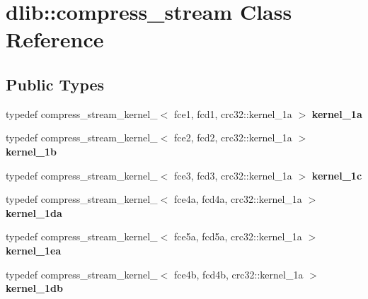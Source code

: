 \hypertarget{classdlib_1_1compress__stream}{
\section{dlib::compress\_\-stream Class Reference}
\label{classdlib_1_1compress__stream}
}
\subsection*{Public Types}
\begin{DoxyCompactItemize}
\item 
\hypertarget{classdlib_1_1compress__stream_a7ac38313ebb877bf19451de0c0380d0f}{
typedef compress\_\-stream\_\-kernel\_$<$ fce1, fcd1, crc32::kernel\_\-1a $>$ {\bfseries kernel\_\-1a}}
\label{classdlib_1_1compress__stream_a7ac38313ebb877bf19451de0c0380d0f}

\item 
\hypertarget{classdlib_1_1compress__stream_a7fb1453dd170b9e3898d428b9a96f62a}{
typedef compress\_\-stream\_\-kernel\_$<$ fce2, fcd2, crc32::kernel\_\-1a $>$ {\bfseries kernel\_\-1b}}
\label{classdlib_1_1compress__stream_a7fb1453dd170b9e3898d428b9a96f62a}

\item 
\hypertarget{classdlib_1_1compress__stream_afaa6401526a71d7a9ca30ee995839264}{
typedef compress\_\-stream\_\-kernel\_$<$ fce3, fcd3, crc32::kernel\_\-1a $>$ {\bfseries kernel\_\-1c}}
\label{classdlib_1_1compress__stream_afaa6401526a71d7a9ca30ee995839264}

\item 
\hypertarget{classdlib_1_1compress__stream_a950476085b35dffd63b5413c33d19c55}{
typedef compress\_\-stream\_\-kernel\_$<$ fce4a, fcd4a, crc32::kernel\_\-1a $>$ {\bfseries kernel\_\-1da}}
\label{classdlib_1_1compress__stream_a950476085b35dffd63b5413c33d19c55}

\item 
\hypertarget{classdlib_1_1compress__stream_a59ed7ead43813f0a7bce882820a60692}{
typedef compress\_\-stream\_\-kernel\_$<$ fce5a, fcd5a, crc32::kernel\_\-1a $>$ {\bfseries kernel\_\-1ea}}
\label{classdlib_1_1compress__stream_a59ed7ead43813f0a7bce882820a60692}

\item 
\hypertarget{classdlib_1_1compress__stream_ac8581a6a7014934197c7f50f66459fc4}{
typedef compress\_\-stream\_\-kernel\_$<$ fce4b, fcd4b, crc32::kernel\_\-1a $>$ {\bfseries kernel\_\-1db}}
\label{classdlib_1_1compress__stream_ac8581a6a7014934197c7f50f66459fc4}


\end{DoxyCompactItemize}
